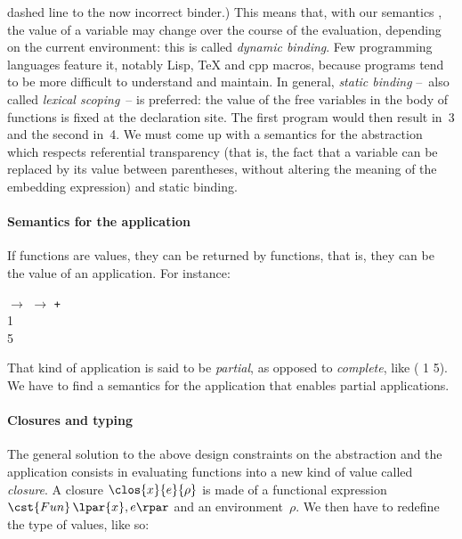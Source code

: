 dashed line to the now incorrect binder.) This means that, with our
semantics , the value of a variable may change
over the course of the evaluation, depending on the current
environment: this is called \emph{dynamic binding}. Few programming
languages feature it, notably Lisp, \TeX{} and \textsf{cpp} macros,
because programs tend to be more difficult to understand and
maintain. In general, \emph{static binding} --~also called
\emph{lexical scoping}~-- is preferred: the value of the free
variables in the body of functions is fixed at the declaration
site. The first program would then result in~3 and the second in~4. We
must come up with a semantics for the abstraction which respects
referential transparency (that is, the fact that a variable can be
replaced by its value between parentheses, without altering the
meaning of the embedding expression) and static binding.

\paragraph{Semantics for the application}

If functions are values, they can be returned by functions, that is,
they can be the value of an application. For instance:
\begin{tabbing}
 \Xlet {} \equal \Xfun {} \(\rightarrow\) \Xfun
  \(\rightarrow\)  \texttt{+}  \Xin\\
 \quad \Xlet {} \equal {} \num{1}\\
 \Xin {} \num{5}
\end{tabbing}
That kind of application is said to be \emph{partial}, as opposed
to \emph{complete}, like ( \num{1} \num{5}). We have to
find a semantics for the application that enables partial
applications.

\paragraph{Closures and typing}

The general solution to the above design constraints on the
abstraction and the application consists in evaluating functions into
a new kind of value called \emph{closure}. A closure
$\clos{x}{e}{\rho}$ is made of a functional expression
$\cst{Fun} \, \lpar{x},e\rpar$ and an environment~$\rho$. We then have
to redefine the type of values, like so:

\bigskip

